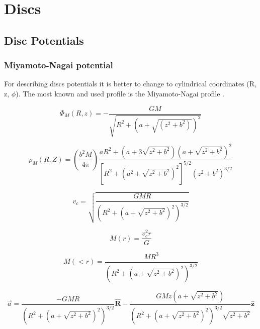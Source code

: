 \chapter{Discs}\label{sec:Discs}
\section{Disc Potentials}

\subsection{Miyamoto-Nagai potential}

For describing discs potentials it is better to change to 
cylindrical coordinates (R, z, $\phi$). The most known and 
used profile is the Miyamoto-Nagai profile \citep{Miyamoto75}. 

\begin{equation}
\Phi_M (R, z) = - \dfrac{GM}{\sqrt{R^2 + (a + \sqrt{(z^2 + b^2)})^2}}
\end{equation}

\begin{equation}
\rho_M (R, Z) = \left( \dfrac{b^2 M}{4 \pi} \right) \dfrac{aR^2 + (a + 3\sqrt{z^2+b^2})(a + \sqrt{z^2+b^2})^2}{[R^2 + (a^2 + \sqrt{z^2+b^2})^2]^{5/2}(z^2+b^2)^{3/2} }
\end{equation}


\begin{equation}
v_c = \sqrt{\dfrac{GMR}{(R^2 + (a + \sqrt{z^2 + b^2})^2)^{3/2}}}
\end{equation}

\begin{equation}
M(r) = \dfrac{v_c^2 r}{G} 
\end{equation}

\begin{equation}
M(<r) = \dfrac{M R^3}{(R^2 + (a + \sqrt{z^2+b^2})^2)^{3/2}}
\end{equation}

\begin{equation}
\vec{a} = \dfrac{-GMR}{(R^2 + (a + \sqrt{z^2 + b^2})^2)^{3/2}} \mathbf{\hat{R}} - \dfrac{GMz (a + \sqrt{z^2+b^2})}{(R^2 + (a + \sqrt{z^2 + b^2})^2)^{3/2}\sqrt{z^2+b^2}} \mathbf{\hat{z}}
\end{equation}

